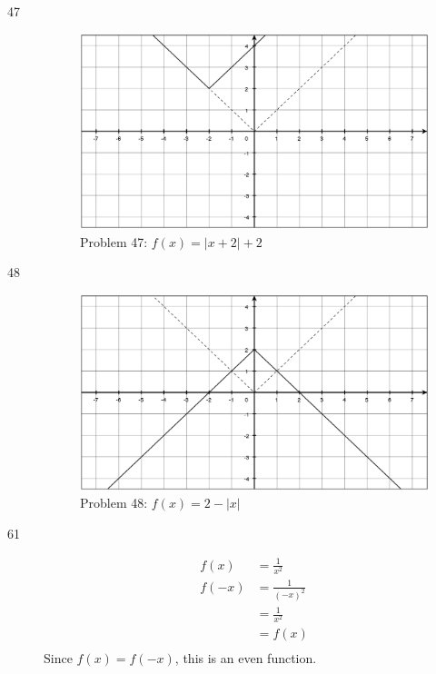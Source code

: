 \documentclass{exam}
\begin{document}
\begin{description}
    \item[47]
      \begin{figure}[H]
        \centering
        \includegraphics[scale=.3]{problem_47.eps}
        \caption*{Problem 47:  $f(x) = |x + 2| + 2$ }
      \end{figure}

    \item[48]
      \begin{figure}[H]
        \centering
        \includegraphics[scale=.3]{problem_48.eps}
        \caption*{Problem 48:  $f(x) = 2 - |x|$ }
      \end{figure}

    \item[61]
      \begin{align*}
        f(x)  &= \frac{1}{x^2} \\
        f(-x) &= \frac{1}{(-x)^2} \\ 
          &= \frac{1}{x^2} \\ 
          &= f(x) \\
      \end{align*}
      Since $f(x) = f(-x)$, this is an even function.


\end{description}
\end{document}
